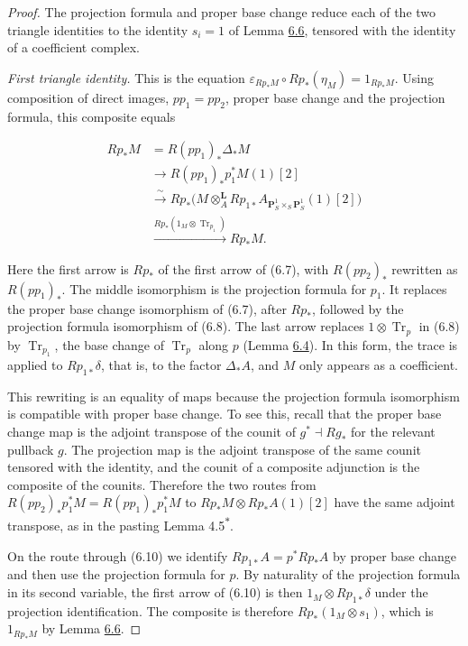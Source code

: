 \documentclass[11pt]{article}
\newcommand{\bpout}[1]{#1\textsuperscript{\hyperlink{bp-outside}{\ensuremath{\ast}}}}
\begin{document}
\begin{proof}[{Proof}]\label{bp23}%
The projection formula and proper base change reduce each of the two triangle identities to the identity \(s_i=1\) of Lemma \hyperref[bp19]{6.6}, tensored with the identity of a coefficient complex.

\emph{First triangle identity.} This is the equation \(\varepsilon_{Rp_*M}\circ Rp_*(\eta_M)=1_{Rp_*M}\). Using composition of direct images, \(pp_1=pp_2\), proper base change and the projection formula, this composite equals

\[
\begin{split}
Rp_*M
&=R(pp_1)_*\Delta_*M\\
&\longrightarrow R(pp_1)_*p_1^*M(1)[2]\\
&\xrightarrow{\ \sim\ }
Rp_*\bigl(M\otimes_A^{\mathbf L}
Rp_{1*}A_{\mathbf P^1_S\times_S\mathbf P^1_S}(1)[2]\bigr)\\
&\xrightarrow{Rp_*(1_M\otimes \operatorname{Tr}_{p_1})}Rp_*M .
\end{split}
\tag{6.10}
\]

Here the first arrow is \(Rp_*\) of the first arrow of (6.7), with \(R(pp_2)_*\) rewritten as \(R(pp_1)_*\). The middle isomorphism is the projection formula for \(p_1\). It replaces the proper base change isomorphism of (6.7), after \(Rp_*\), followed by the projection formula isomorphism of (6.8). The last arrow replaces \(1\otimes\operatorname{Tr}_p\) in (6.8) by \(\operatorname{Tr}_{p_1}\), the base change of \(\operatorname{Tr}_p\) along \(p\) (Lemma \hyperref[bp14]{6.4}). In this form, the trace is applied to \(Rp_{1*}\delta\), that is, to the factor \(\Delta_*A\), and \(M\) only appears as a coefficient.

This rewriting is an equality of maps because the projection formula isomorphism is compatible with proper base change. To see this, recall that the proper base change map is the adjoint transpose of the counit of \(g^*\dashv Rg_*\) for the relevant pullback \(g\). The projection map is the adjoint transpose of the same counit tensored with the identity, and the counit of a composite adjunction is the composite of the counits. Therefore the two routes from \(R(pp_2)_*p_1^*M=R(pp_1)_*p_1^*M\) to \(Rp_*M\otimes Rp_*A(1)[2]\) have the same adjoint transpose, as in the pasting Lemma \bpout{4.5}.

On the route through (6.10) we identify \(Rp_{1*}A=p^*Rp_*A\) by proper base change and then use the projection formula for \(p\). By naturality of the projection formula in its second variable, the first arrow of (6.10) is then \(1_M\otimes Rp_{1*}\delta\) under the projection identification. The composite is therefore \(Rp_*(1_M\otimes s_1)\), which is \(1_{Rp_*M}\) by Lemma \hyperref[bp19]{6.6}.


\end{proof}
\end{document}
